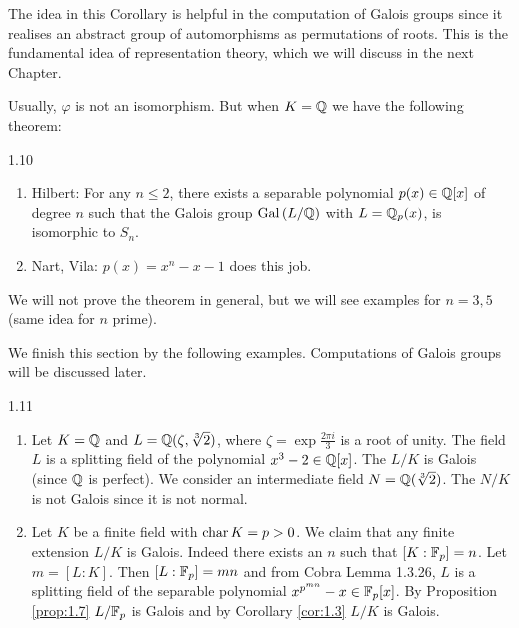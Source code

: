 \documentclass[twoside = false,	%
		headsepline,		%
		parskip = true,
		]{scrbook}						%
\begin{document}
        The idea in this Corollary is helpful in the computation of Galois groups since it realises an abstract group of automorphisms as permutations of roots. This is the fundamental idea of representation theory, which we will discuss in the next Chapter.
        
        Usually, $\varphi$ is not an isomorphism. But when $K = \mathbb Q$  we have the following theorem:
        
        \begin{theorem}{}{1.10}
        \begin{enumerate}
            \item Hilbert: For any $n \leq 2$, there exists a separable polynomial $p(x) \in \mathbb Q[x]$ of degree $n$ such that the Galois group $\mathrm{Gal}\left( L/\mathbb Q\right)$ with $L = \mathbb Q_p(x)$, is isomorphic to $S_n$.
            \item Nart, Vila: $p(x) = x^n - x -1$ does this job.
        \end{enumerate}
        \end{theorem}
        
        We will not prove the theorem in general, but we will see examples for $n=3,5$ (same idea for $n$ prime).
        
        We finish this section by the following examples. Computations of Galois groups will be discussed later.
        
        \begin{example}{}{1.11}
            \begin{enumerate}
                \item Let $K=\mathbb Q$ and $L = \mathbb Q(\zeta,\sqrt[3]{2})$, where $\zeta = \exp{\frac{2\pi i}{3}}$ is a root of unity. The field $L$ is a splitting field of the polynomial $x^3-2 \in \mathbb Q[x]$. The $L/K$ is Galois (since $\mathbb Q$ is perfect). We consider an intermediate field $N = \mathbb Q(\sqrt[3]{2})$. The $N/K$ is not Galois since it is not normal.
                \item Let $K$ be a finite field with $\mathrm{char} \, K = p > 0$. We claim that any finite extension $L/K$ is Galois. Indeed there exists an $n$ such that $[K:\mathbb F_p] = n$. Let $m = [L:K]$. Then $[L:\mathbb F_p] = mn$ and from Cobra \cite{Cobra} Lemma 1.3.26, $L$ is a splitting field of the separable polynomial $x^{p^{mn}}-x\in \mathbb F_p[x]$. By Proposition \ref{prop:1.7} $L/\mathbb F_p$ is Galois and by Corollary \ref{cor:1.3} $L/K$ is Galois. %
            \end{enumerate}
        \end{example}
        
\end{document}
